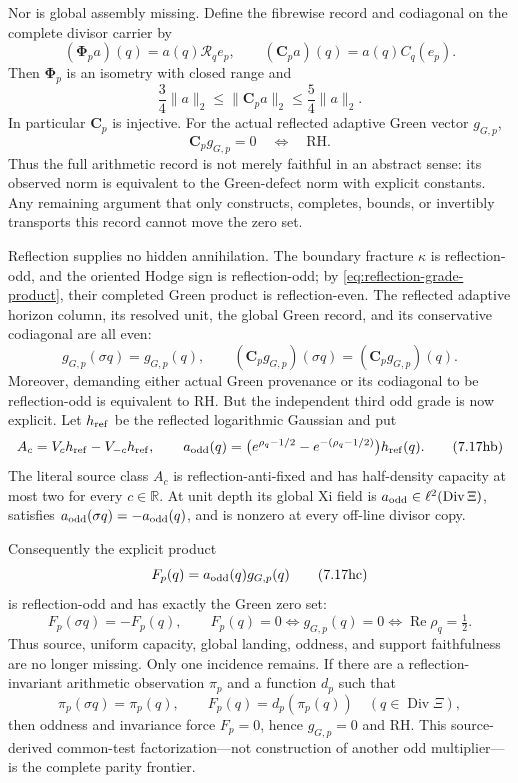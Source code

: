 \documentclass[11pt]{article}
\theoremstyle{definition}
\theoremstyle{remark}
\newcommand{\R}{\mathbb R}
\newcommand{\Rea}{\operatorname{Re}}
\newcommand{\Div}{\operatorname{Div}}
\begin{document}
Nor is global assembly missing.  Define the fibrewise record and
codiagonal on the complete divisor carrier by
\[
 (\boldsymbol\Phi_pa)(q)=a(q)\mathcal R_qe_p,\qquad
 (\boldsymbol C_pa)(q)=a(q)C_q(e_p).
\tag{7.17f}\label{eq:global-reflected-comparison}
\]
Then \(\boldsymbol\Phi_p\) is an isometry with closed range and
\[
 \frac34\|a\|_2\le\|\boldsymbol C_pa\|_2
       \le\frac54\|a\|_2 .
\tag{7.17g}\label{eq:global-codiagonal-equivalence}
\]
In particular \(\boldsymbol C_p\) is injective.  For the actual reflected
adaptive Green vector \(g_{G,p}\),
\[
                   \boldsymbol C_pg_{G,p}=0
                   \quad\Longleftrightarrow\quad\mathrm{RH}.
\tag{7.17h}\label{eq:global-codiagonal-rh}
\]
Thus the full arithmetic record is not merely faithful in an abstract
sense: its observed norm is equivalent to the Green-defect norm with explicit
constants.  Any remaining argument that only constructs, completes,
bounds, or invertibly transports this record cannot move the zero set.

Reflection supplies no hidden annihilation.  The boundary fracture
\(\kappa\) is reflection-odd, and the oriented Hodge sign is reflection-odd;
by \eqref{eq:reflection-grade-product}, their completed Green product is
reflection-even.  The reflected adaptive horizon column, its resolved unit,
the global Green record, and its conservative codiagonal are all even:
\[
        g_{G,p}(\sigma q)=g_{G,p}(q),\qquad
        (\boldsymbol C_pg_{G,p})(\sigma q)
          =(\boldsymbol C_pg_{G,p})(q).
\tag{7.17ha}\label{eq:double-odd-green-even}
\]
Moreover, demanding either actual Green provenance or its codiagonal to be
reflection-odd is equivalent to RH.  But the independent third odd grade is
now explicit.  Let \(h_{\rm ref}\) be the reflected logarithmic Gaussian and
put
\[
 A_c=V_ch_{\rm ref}-V_{-c}h_{\rm ref},\qquad
 a_{\rm odd}(q)=
 \bigl(e^{\rho_q-1/2}-e^{-(\rho_q-1/2)}\bigr)h_{\rm ref}(q).
\tag{7.17hb}\label{eq:explicit-odd-grade}
\]
The literal source class \(A_c\) is reflection-anti-fixed and has
half-density capacity at most two for every \(c\in\R\).  At unit depth its
global Xi field is \(a_{\rm odd}\in\ell^2(\Div\Xi)\), satisfies
\(a_{\rm odd}(\sigma q)=-a_{\rm odd}(q)\), and is nonzero at every off-line
divisor copy.

Consequently the explicit product
\[
                 F_p(q)=a_{\rm odd}(q)g_{G,p}(q)
\tag{7.17hc}\label{eq:explicit-odd-green-product}
\]
is reflection-odd and has exactly the Green zero set:
\[
       F_p(\sigma q)=-F_p(q),\qquad
       F_p(q)=0\Longleftrightarrow g_{G,p}(q)=0
       \Longleftrightarrow\Rea\rho_q=\tfrac12.
\tag{7.17hd}\label{eq:odd-product-zero-set}
\]
Thus source, uniform capacity, global landing, oddness, and support
faithfulness are no longer missing.  Only one incidence remains.  If there
are a reflection-invariant arithmetic observation \(\pi_p\) and a function
\(d_p\) such that
\[
       \pi_p(\sigma q)=\pi_p(q),\qquad
       F_p(q)=d_p(\pi_p(q))
       \quad(q\in\Div\Xi),
\tag{7.17he}\label{eq:missing-odd-factorization}
\]
then oddness and invariance force \(F_p=0\), hence \(g_{G,p}=0\) and RH.
This source-derived common-test factorization---not construction of another
odd multiplier---is the complete parity frontier.
\end{document}
